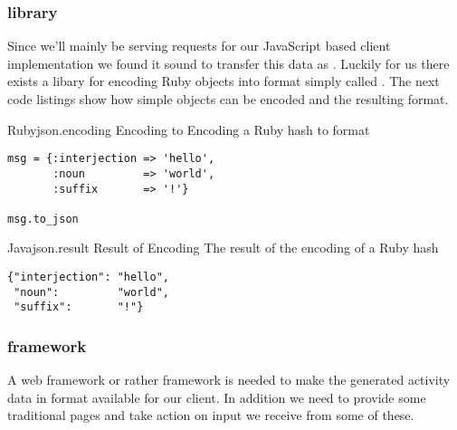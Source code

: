 \subsubsection{ library}

Since we'll mainly be serving requests
for our JavaScript based client implementation we found it sound to transfer
this data as .%
Luckily for us there exists a libary for encoding
Ruby objects into  format
simply called .%
The next code listings show how simple objects can be encoded and the
resulting  format.

\begin{scode}{Ruby}{json.encoding}{%
  Encoding to }{%
  Encoding a Ruby hash to  format}
\begin{lstlisting}
msg = {:interjection => 'hello',
       :noun         => 'world',
       :suffix       => '!'}

msg.to_json
\end{lstlisting}
\end{scode}

\begin{scode}{Java}{json.result}{%
  Result of  Encoding}{%
  The result of the  encoding of a Ruby hash}
\begin{lstlisting}
{"interjection": "hello",
 "noun":         "world",
 "suffix":       "!"}
\end{lstlisting}
\end{scode}

\subsubsection{ framework}

A web framework or rather  framework is needed to make the
generated activity data in  format available for our client.
In addition we need to provide some traditional  pages and
take action on input we receive from some of these.

